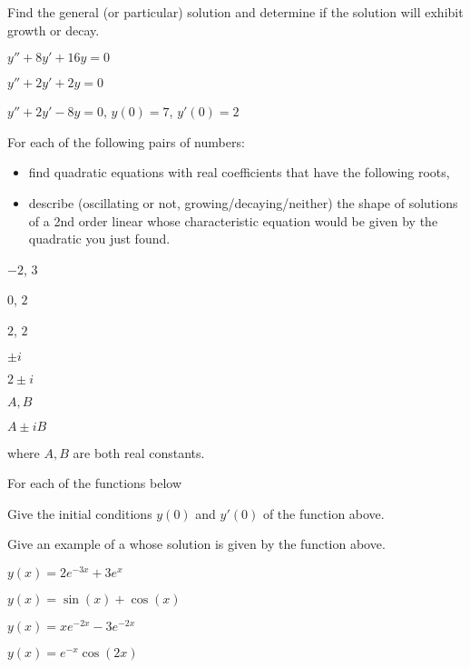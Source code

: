 \begin{question}
Find the general (or particular) solution and determine if the solution will exhibit growth or decay. 
\begin{colenumerate}
\item $y''+8y'+16y = 0$
\item $y''+2y'+2y = 0$
\item $y''+2y'-8y = 0$, $y(0) = 7$, $y'(0) = 2$
\end{colenumerate}
\end{question}

\begin{question}
  For each of the following pairs of numbers:
  \begin{itemize}
  \item find quadratic equations with real coefficients that have the following roots,
  \item describe (oscillating or not, growing/decaying/neither) the shape of solutions of a 2nd order linear \ode{} whose characteristic equation would be given by the quadratic you just found.
  \end{itemize}
    \begin{colenumerate}[4]
    \item \(-2\), \(3\)
    \item \(0\), \(2\)
    \item \(2\), \(2\)
    \item \(\pm i\)
    \item \(2 \pm i\)
    \item \(A, B\)
    \item \(A \pm i B\)
    \end{colenumerate}
where \(A, B\) are both real constants.
\end{question}

\begin{question}
  For each of the functions below
  \begin{compactitem}
  \item Give the initial conditions \(y(0)\) and \(y'(0)\) of the function above.
  \item Give an example of a \ode{} whose solution is given by the function above.
  \end{compactitem}

  \begin{colenumerate}[2]
  \item \(y(x) = 2e^{-3x} + 3 e^{x}\)
  \item \(y(x) = \sin(x) + \cos(x)\)
  \item \(y(x) = xe^{-2x} -3 e^{-2x}\)
  \item \(y(x) = e^{-x}\cos(2x)\)
  \end{colenumerate}
\end{question}


